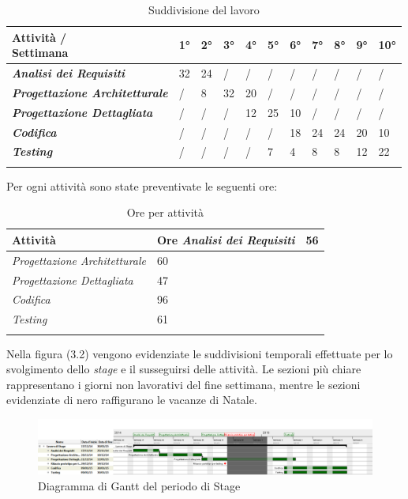 \begin{longtable}{ p{} | p{} | p{} | p{} | p{} | p{} | p{} | p{} | p{} | p{}  | p{}}
\textbf{Attività / \newline Settimana} & 1° & 2° & 3° & 4° & 5° & 6° & 7° & 8° & 9° & 10° \\
\endhead
\midrule
\textbf{\textit{{\color{OliveGreen}Analisi dei Requisiti}}} & 32 & 24  & / & / & / & / & / & / & / & / \\
\midrule
\textbf{\textit{{\color{OliveGreen}Progettazione Architetturale}}} & / & 8 & 32 & 20 & / & / & / & / & / & / \\
\midrule
\textbf{\textit{{\color{OliveGreen}Progettazione Dettagliata}}} & / & / & / & 12 & 25 & 10 & / & / & / & / \\
\midrule
\textbf{\textit{{\color{OliveGreen}Codifica}}} & / & / & / & / & / & 18 & 24 & 24 & 20 & 10 \\
\midrule
\textbf{\textit{{\color{OliveGreen}Testing}}} & / & / & / & / & 7 & 4 & 8 & 8 & 12 & 22 \\
\bottomrule
\caption{Suddivisione del lavoro}
\end{longtable}

Per ogni attività sono state preventivate le seguenti ore:

\begin{longtable}{ p{} | p{} }
\textbf{Attività} & \textbf{Ore}
\endhead
\midrule
\textit{Analisi dei Requisiti} & 56 \\
\midrule
\textit{Progettazione Architetturale} & 60 \\
\midrule
\textit{Progettazione Dettagliata} & 47\\
\midrule
\textit{Codifica} & 96 \\
\midrule
\textit{Testing} & 61 \\
\bottomrule
\caption{Ore per attività }
\end{longtable}

 
Nella figura (3.2) vengono evidenziate le suddivisioni temporali effettuate per lo svolgimento dello \textit{stage} e il susseguirsi delle attività. Le sezioni più chiare rappresentano i giorni non lavorativi del fine settimana, mentre le sezioni evidenziate di nero raffigurano le vacanze di Natale.
\begin{figure}[htbp]

\includegraphics[width=1\textwidth]{./capitoli/capitolo3/img/da}
\caption{Diagramma di Gantt del periodo di Stage}
\end{figure}



